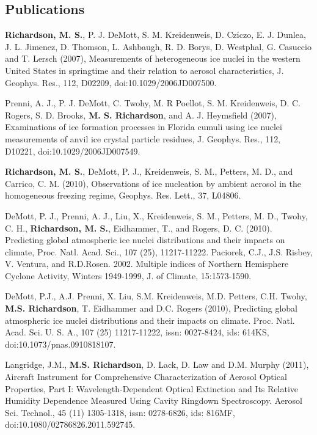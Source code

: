 \documentclass[margin,line]{res}
\begin{document}
\begin{resume}

\section{\sc Publications}
{\bf Richardson, M. S.}, P. J. DeMott, S. M. Kreidenweis, D. Cziczo, E. J. Dunlea, J. L. Jimenez, D. Thomson, L. Ashbaugh, R. D. Borys, D. Westphal, G. Casuccio and T. Lersch (2007), Measurements of heterogeneous ice nuclei in the western United States in springtime and their relation to aerosol characteristics, J. Geophys. Res., 112, D02209, doi:10.1029/2006JD007500.

Prenni, A. J., P. J. DeMott, C. Twohy, M. R Poellot, S. M. Kreidenweis, D. C. Rogers, S. D. Brooks, {\bf M. S. Richardson}, and A. J. Heymsfield (2007), Examinations of ice formation processes in Florida cumuli using ice nuclei measurements of anvil ice crystal particle residues, J. Geophys. Res., 112, D10221, doi:10.1029/2006JD007549.

{\bf Richardson, M. S.}, DeMott, P. J., Kreidenweis, S. M., Petters, M. D., and Carrico, C. M. (2010), Observations of ice nucleation by ambient aerosol in the homogeneous freezing regime, Geophys. Res. Lett., 37, L04806.

DeMott, P. J., Prenni, A. J., Liu, X., Kreidenweis, S. M., Petters, M. D., Twohy, C. H., {\bf Richardson, M. S.}, Eidhammer, T., and Rogers, D. C. (2010). Predicting global atmospheric ice nuclei distributions and their impacts on climate, Proc. Natl. Acad. Sci., 107 (25), 11217-11222.
Paciorek, C.J., J.S. Risbey, V. Ventura, and R.D.Rosen. 2002. Multiple indices of Northern Hemisphere Cyclone
Activity, Winters 1949-1999, J. of Climate, 15:1573-1590.

DeMott, P.J., A.J. Prenni, X. Liu, S.M. Kreidenweis, M.D. Petters, C.H. Twohy, {\bf M.S. Richardson}, T. Eidhammer and D.C. Rogers (2010), Predicting global atmospheric ice nuclei distributions and their impacts on climate. Proc. Natl. Acad. Sci. U. S. A., 107 (25) 11217-11222, issn: 0027-8424, ids: 614KS, doi:10.1073/pnas.0910818107.

Langridge, J.M., {\bf M.S. Richardson}, D. Lack, D. Law and D.M. Murphy (2011), Aircraft Instrument for Comprehensive Characterization of Aerosol Optical Properties, Part I: Wavelength-Dependent Optical Extinction and Its Relative Humidity Dependence Measured Using Cavity Ringdown Spectroscopy. Aerosol Sci. Technol., 45 (11) 1305-1318, issn: 0278-6826, ids: 816MF, doi:10.1080/02786826.2011.592745.


\end{resume}
\end{document}
